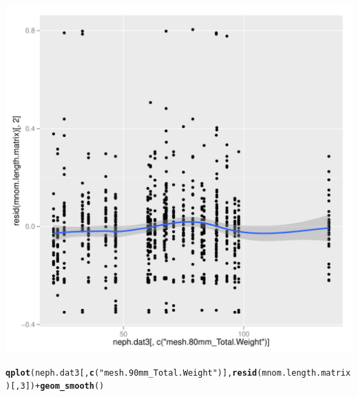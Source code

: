 \documentclass[12pt]{article}\usepackage[]{graphicx}\usepackage[]{color}
\makeatletter
\def\maxwidth{ %
  \ifdim\Gin@nat@width>\linewidth
    \linewidth
  \else
    \Gin@nat@width
  \fi
}
\newcommand{\hlnum}[1]{\textcolor[rgb]{0.686,0.059,0.569}{#1}}%
\newcommand{\hlstr}[1]{\textcolor[rgb]{0.192,0.494,0.8}{#1}}%
\newcommand{\hlopt}[1]{\textcolor[rgb]{0,0,0}{#1}}%
\newcommand{\hlstd}[1]{\textcolor[rgb]{0.345,0.345,0.345}{#1}}%
\newcommand{\hlkwd}[1]{\textcolor[rgb]{0.737,0.353,0.396}{\textbf{#1}}}%
\newenvironment{kframe}{%
 \def\at@end@of@kframe{}%
 \ifinner\ifhmode%
  \def\at@end@of@kframe{\end{minipage}}%
  \begin{minipage}{\columnwidth}%
 \fi\fi%
 \def\FrameCommand##1{\hskip\@totalleftmargin \hskip-\fboxsep
 \colorbox{shadecolor}{##1}\hskip-\fboxsep
     \hskip-\linewidth \hskip-\@totalleftmargin \hskip\columnwidth}%
 \MakeFramed {\advance\hsize-\width
   \@totalleftmargin\z@ \linewidth\hsize
   \@setminipage}}%
 {\par\unskip\endMakeFramed%
 \at@end@of@kframe}
\newenvironment{knitrout}{}{} %
\makeatother
\begin{document}
\begin{knitrout}
\begin{kframe}
{\ttfamily\noindent\itshape{}}\end{kframe}
\includegraphics[width=\maxwidth]{figure/unnamed-chunk-9-3} 
\begin{kframe}\begin{alltt}
\hlkwd{qplot}\hlstd{(neph.dat3[,} \hlkwd{c}\hlstd{(}\hlstr{"mesh.90mm_Total.Weight"}\hlstd{)],} \hlkwd{resid}\hlstd{(mnom.length.matrix)[,}\hlnum{3}\hlstd{])} \hlopt{+} \hlkwd{geom_smooth}\hlstd{()}
\end{alltt}



\end{kframe}
\end{knitrout}
\end{document}
